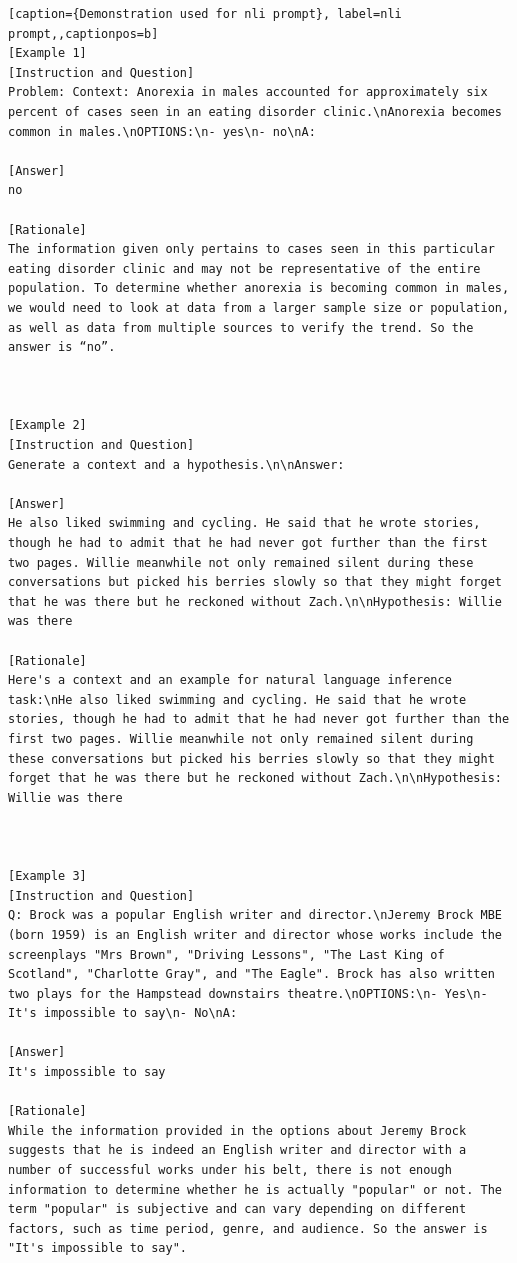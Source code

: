 \begin{lstlisting}[caption={Demonstration used for nli prompt}, label=nli prompt,,captionpos=b]
[Example 1]
[Instruction and Question]
Problem: Context: Anorexia in males accounted for approximately six percent of cases seen in an eating disorder clinic.\nAnorexia becomes common in males.\nOPTIONS:\n- yes\n- no\nA: 

[Answer]
no

[Rationale]
The information given only pertains to cases seen in this particular eating disorder clinic and may not be representative of the entire population. To determine whether anorexia is becoming common in males, we would need to look at data from a larger sample size or population, as well as data from multiple sources to verify the trend. So the answer is “no”.



[Example 2]
[Instruction and Question]
Generate a context and a hypothesis.\n\nAnswer: 

[Answer]
He also liked swimming and cycling. He said that he wrote stories, though he had to admit that he had never got further than the first two pages. Willie meanwhile not only remained silent during these conversations but picked his berries slowly so that they might forget that he was there but he reckoned without Zach.\n\nHypothesis: Willie was there

[Rationale]
Here's a context and an example for natural language inference task:\nHe also liked swimming and cycling. He said that he wrote stories, though he had to admit that he had never got further than the first two pages. Willie meanwhile not only remained silent during these conversations but picked his berries slowly so that they might forget that he was there but he reckoned without Zach.\n\nHypothesis: Willie was there



[Example 3]
[Instruction and Question]
Q: Brock was a popular English writer and director.\nJeremy Brock MBE (born 1959) is an English writer and director whose works include the screenplays "Mrs Brown", "Driving Lessons", "The Last King of Scotland", "Charlotte Gray", and "The Eagle". Brock has also written two plays for the Hampstead downstairs theatre.\nOPTIONS:\n- Yes\n- It's impossible to say\n- No\nA: 

[Answer]
It's impossible to say

[Rationale]
While the information provided in the options about Jeremy Brock suggests that he is indeed an English writer and director with a number of successful works under his belt, there is not enough information to determine whether he is actually "popular" or not. The term "popular" is subjective and can vary depending on different factors, such as time period, genre, and audience. So the answer is "It's impossible to say".




\end{lstlisting}
